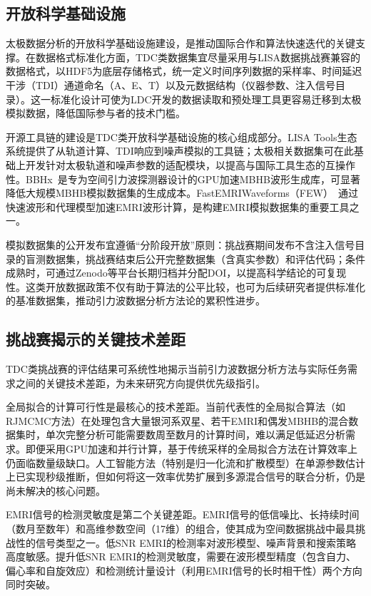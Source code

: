\subsection{开放科学基础设施}

太极数据分析的开放科学基础设施建设，是推动国际合作和算法快速迭代的关键支撑。在数据格式标准化方面，TDC类数据集宜尽量采用与LISA数据挑战赛兼容的数据格式，以HDF5为底层存储格式，统一定义时间序列数据的采样率、时间延迟干涉（TDI）通道命名（A、E、T）以及元数据结构（仪器参数、注入信号目录）。这一标准化设计可使为LDC开发的数据读取和预处理工具更容易迁移到太极模拟数据，降低国际参与者的技术门槛。

开源工具链的建设是TDC类开放科学基础设施的核心组成部分。LISA Tools生态系统提供了从轨道计算、TDI响应到噪声模拟的工具链；太极相关数据集可在此基础上开发针对太极轨道和噪声参数的适配模块，以提高与国际工具生态的互操作性。BBHx~\cite{Katz2020BBHx}是专为空间引力波探测器设计的GPU加速MBHB波形生成库，可显著降低大规模MBHB模拟数据集的生成成本。FastEMRIWaveforms（FEW）~\cite{Chua2021FEW}通过快速波形和代理模型加速EMRI波形计算，是构建EMRI模拟数据集的重要工具之一。

模拟数据集的公开发布宜遵循“分阶段开放”原则：挑战赛期间发布不含注入信号目录的盲测数据集，挑战赛结束后公开完整数据集（含真实参数）和评估代码；条件成熟时，可通过Zenodo等平台长期归档并分配DOI，以提高科学结论的可复现性。这类开放数据政策不仅有助于算法的公平比较，也可为后续研究者提供标准化的基准数据集，推动引力波数据分析方法论的累积性进步。

\subsection{挑战赛揭示的关键技术差距}

TDC类挑战赛的评估结果可系统性地揭示当前引力波数据分析方法与实际任务需求之间的关键技术差距，为未来研究方向提供优先级指引。

全局拟合的计算可行性是最核心的技术差距。当前代表性的全局拟合算法（如RJMCMC方法）在处理包含大量银河系双星、若干EMRI和偶发MBHB的混合数据集时，单次完整分析可能需要数周至数月的计算时间，难以满足低延迟分析需求。即便采用GPU加速和并行计算，基于传统采样的全局拟合方法在计算效率上仍面临数量级缺口。人工智能方法（特别是归一化流和扩散模型）在单源参数估计上已实现秒级推断，但如何将这一效率优势扩展到多源混合信号的联合分析，仍是尚未解决的核心问题。

EMRI信号的检测灵敏度是第二个关键差距。EMRI信号的低信噪比、长持续时间（数月至数年）和高维参数空间（17维）的组合，使其成为空间数据挑战中最具挑战性的信号类型之一。低SNR EMRI的检测率对波形模型、噪声背景和搜索策略高度敏感。提升低SNR EMRI的检测灵敏度，需要在波形模型精度（包含自力、偏心率和自旋效应）和检测统计量设计（利用EMRI信号的长时相干性）两个方向同时突破。

